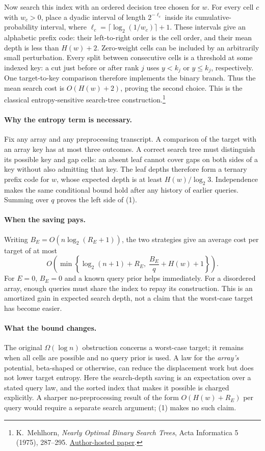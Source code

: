 \documentclass[11pt,letterpaper]{article}
\begin{document}
Now search this index with an ordered decision tree chosen for $w$.
For every cell $c$ with $w_c>0$, place a dyadic interval of length
$2^{-\ell_c}$ inside its cumulative-probability interval, where
$\ell_c=\lceil\log_2(1/w_c)\rceil+1$. These intervals give an
alphabetic prefix code: their left-to-right order is the cell order,
and their mean depth is less than $H(w)+2$.
Zero-weight cells can be included by an arbitrarily small perturbation.
Every split between consecutive cells is a threshold at some indexed
key: a cut just before or after rank $j$ uses $y<k_j$ or
$y\le k_j$, respectively. One target-to-key comparison
therefore implements the binary branch. Thus the mean search cost is $O(H(w)+2)$, proving the
second choice. This is the classical entropy-sensitive search-tree
construction.\footnote{K.~Mehlhorn, \emph{Nearly Optimal Binary Search
Trees}, Acta Informatica 5 (1975), 287--295.
\href{https://people.mpi-inf.mpg.de/~mehlhorn/ftp/mehlhorn3.pdf}{Author-hosted paper}.}

\paragraph{Why the entropy term is necessary.}
Fix any array and any preprocessing transcript. A comparison of the
target with an array key has at most three outcomes. A correct search
tree must distinguish its possible key and gap cells: an absent leaf
cannot cover gaps on both sides of a key without also admitting that
key. The leaf depths therefore form a ternary prefix code for $w$,
whose expected depth is at least $H(w)/\log_2 3$. Independence makes
the same conditional bound hold after any history of earlier queries.
Summing over $q$ proves the left side of (1).

\paragraph{When the saving pays.}
Writing $B_E=O(n\log_2(R_E+1))$, the two strategies give an average
cost per target of at most
\[
 O\!\left(\min\left\{\log_2(n+1)+R_E,\;
                  \frac{B_E}{q}+H(w)+1\right\}\right).
 \tag{2}
\]
For $E=0$, $B_E=0$ and a known query prior helps immediately.
For a disordered array, enough queries must share the index to repay
its construction. This is an amortized gain in expected search depth,
not a claim that the worst-case target has become easier.

\paragraph{What the bound changes.}
The original $\Omega(\log n)$ obstruction concerns a worst-case target;
it remains when all cells are possible and no query prior is used.
A law for the \emph{array's} potential, beta-shaped or otherwise, can
reduce the displacement work but does not lower target entropy.
Here the search-depth saving is an expectation over a stated query law,
and the sorted index that makes it possible is charged explicitly.
A sharper no-preprocessing result of the form
$O(H(w)+R_E)$ per query would require a separate search argument;
(1) makes no such claim.
\end{document}
